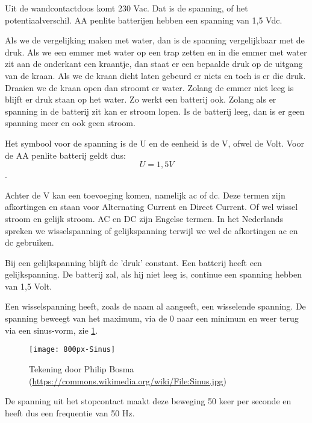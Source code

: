 Uit de wandcontactdoos komt 230 Vac. Dat is de spanning, of het potentiaalverschil. AA penlite batterijen hebben een spanning van 1,5 Vdc.

Als we de vergelijking maken met water, dan is de spanning vergelijkbaar met de druk. Als we een emmer met water op een trap zetten en in die emmer met water zit aan de onderkant een kraantje, dan staat er een bepaalde druk op de uitgang van de kraan. Als we de kraan dicht laten gebeurd er niets en toch is er die druk. Draaien we de kraan open dan stroomt er water. Zolang de emmer niet leeg is blijft er druk staan op het water. Zo werkt een batterij ook. Zolang als er spanning in de batterij zit kan er stroom lopen. Is de batterij leeg, dan is er geen spanning meer en ook geen stroom.

Het symbool voor de spanning is de U en de eenheid is de V, ofwel de Volt. Voor de AA penlite batterij geldt dus: \[ U = 1,5 V \].

Achter de V kan een toevoeging komen, namelijk ac of dc. Deze termen zijn afkortingen en staan voor Alternating Current en Direct Current. Of wel wissel stroom en gelijk stroom. AC en DC zijn Engelse termen. In het Nederlands spreken we wisselspanning of gelijkspanning terwijl we wel de afkortingen ac en dc gebruiken.

Bij een gelijkspanning blijft de 'druk' constant. Een batterij heeft een gelijkspanning. De batterij zal, als hij niet leeg is, continue een spanning hebben van 1,5 Volt.

Een wisselspanning heeft, zoals de naam al aangeeft, een wisselende spanning. De spanning beweegt van het maximum, via de 0 naar een minimum en weer terug via een sinus-vorm, zie \ref{fig:sinus}.

\begin{figure}[h]
\texttt{[image: 800px-Sinus]}
\centering
\caption{Tekening door Philip Bosma (\url{https://commons.wikimedia.org/wiki/File:Sinus.jpg})}
\label{fig:sinus}
\end{figure}

De spanning uit het stopcontact maakt deze beweging 50 keer per seconde en heeft dus een frequentie van 50 Hz.

